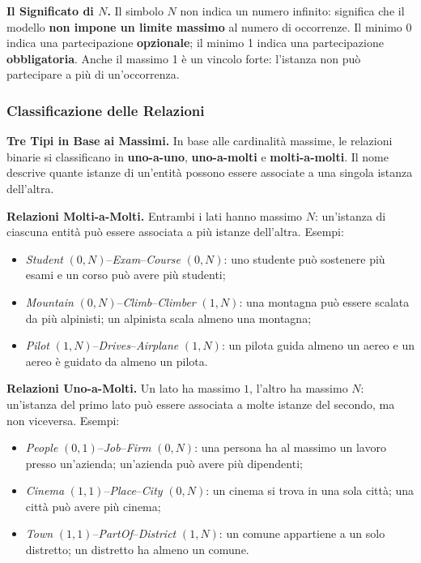 \documentclass[12pt]{extarticle}
\begin{document}
\medskip
\noindent \textbf{Il Significato di $N$.} Il simbolo $N$ non indica un numero infinito: significa che il modello \textbf{non impone un limite massimo} al numero di occorrenze. Il minimo 0 indica una partecipazione \textbf{opzionale}; il minimo 1 indica una partecipazione \textbf{obbligatoria}. Anche il massimo 1 è un vincolo forte: l'istanza non può partecipare a più di un'occorrenza.

\subsubsection{Classificazione delle Relazioni}

\noindent \textbf{Tre Tipi in Base ai Massimi.} In base alle cardinalità massime, le relazioni binarie si classificano in \textbf{uno-a-uno}, \textbf{uno-a-molti} e \textbf{molti-a-molti}. Il nome descrive quante istanze di un'entità possono essere associate a una singola istanza dell'altra.

\medskip
\noindent \textbf{Relazioni Molti-a-Molti.} Entrambi i lati hanno massimo $N$: un'istanza di ciascuna entità può essere associata a più istanze dell'altra. Esempi:
\begin{itemize}
    \item \textit{Student} $(0,N)$--\textit{Exam}--\textit{Course} $(0,N)$: uno studente può sostenere più esami e un corso può avere più studenti;
    \item \textit{Mountain} $(0,N)$--\textit{Climb}--\textit{Climber} $(1,N)$: una montagna può essere scalata da più alpinisti; un alpinista scala almeno una montagna;
    \item \textit{Pilot} $(1,N)$--\textit{Drives}--\textit{Airplane} $(1,N)$: un pilota guida almeno un aereo e un aereo è guidato da almeno un pilota.
\end{itemize}

\medskip
\noindent \textbf{Relazioni Uno-a-Molti.} Un lato ha massimo $1$, l'altro ha massimo $N$: un'istanza del primo lato può essere associata a molte istanze del secondo, ma non viceversa. Esempi:
\begin{itemize}
    \item \textit{People} $(0,1)$--\textit{Job}--\textit{Firm} $(0,N)$: una persona ha al massimo un lavoro presso un'azienda; un'azienda può avere più dipendenti;
    \item \textit{Cinema} $(1,1)$--\textit{Place}--\textit{City} $(0,N)$: un cinema si trova in una sola città; una città può avere più cinema;
    \item \textit{Town} $(1,1)$--\textit{PartOf}--\textit{District} $(1,N)$: un comune appartiene a un solo distretto; un distretto ha almeno un comune.
\end{itemize}
\end{document}
